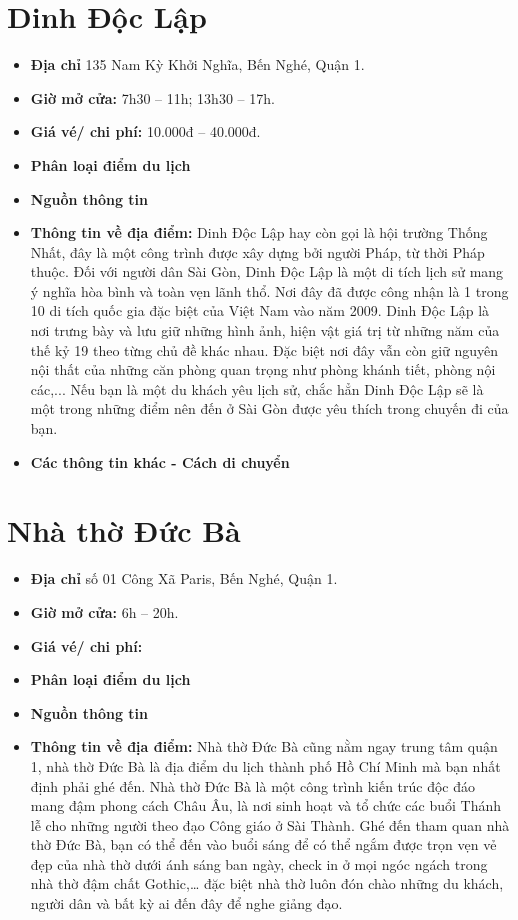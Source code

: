 \documentclass{article}
\begin{document}
\section{Dinh Độc Lập}
\begin{itemize}
    \item{\textbf{Địa chỉ}} 135 Nam Kỳ Khởi Nghĩa, Bến Nghé, Quận 1.
    \item{\textbf{Giờ mở cửa:}} 7h30 – 11h; 13h30 – 17h.
    \item{\textbf{Giá vé/ chi phí:}} 10.000đ – 40.000đ.
    \item{\textbf{Phân loại điểm du lịch}}
    \item{\textbf{Nguồn thông tin}}
    \item{\textbf{Thông tin về địa điểm:}} Dinh Độc Lập hay còn gọi là hội trường Thống Nhất, đây là một công trình được xây dựng bởi người Pháp, từ thời Pháp thuộc. Đối với người dân Sài Gòn, Dinh Độc Lập là một di tích lịch sử mang ý nghĩa hòa bình và toàn vẹn lãnh thổ. Nơi đây đã được công nhận là 1 trong 10 di tích quốc gia đặc biệt của Việt Nam vào năm 2009. Dinh Độc Lập là nơi trưng bày và lưu giữ những hình ảnh, hiện vật giá trị từ những năm của thế kỷ 19 theo từng chủ đề khác nhau. Đặc biệt nơi đây vẫn còn giữ nguyên nội thất của những căn phòng quan trọng như phòng khánh tiết, phòng nội các,... Nếu bạn là một du khách yêu lịch sử, chắc hẳn Dinh Độc Lập sẽ là một trong những điểm nên đến ở Sài Gòn được yêu thích trong chuyến đi của bạn.
\end{itemize}

\begin{itemize}
    \item{\textbf{Các thông tin khác - Cách di chuyển}}
\end{itemize}

\section{Nhà thờ Đức Bà}
\begin{itemize}
    \item{\textbf{Địa chỉ}} số 01 Công Xã Paris, Bến Nghé, Quận 1.
    \item{\textbf{Giờ mở cửa:}} 6h – 20h.
    \item{\textbf{Giá vé/ chi phí:}}
    \item{\textbf{Phân loại điểm du lịch}}
    \item{\textbf{Nguồn thông tin}}
    \item{\textbf{Thông tin về địa điểm:}} Nhà thờ Đức Bà cũng nằm ngay trung tâm quận 1, nhà thờ Đức Bà là địa điểm du lịch thành phố Hồ Chí Minh mà bạn nhất định phải ghé đến. Nhà thờ Đức Bà là một công trình kiến trúc độc đáo mang đậm phong cách Châu Âu, là nơi sinh hoạt và tổ chức các buổi Thánh lễ cho những người theo đạo Công giáo ở Sài Thành. Ghé đến tham quan nhà thờ Đức Bà, bạn có thể đến vào buổi sáng để có thể ngắm được trọn vẹn vẻ đẹp của nhà thờ dưới ánh sáng ban ngày, check in ở mọi ngóc ngách trong nhà thờ đậm chất Gothic,… đặc biệt nhà thờ luôn đón chào những du khách, người dân và bất kỳ ai đến đây để nghe giảng đạo.
\end{itemize}
\end{document}
